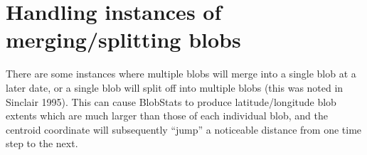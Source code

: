\documentclass{article}
\begin{document}
%
%
%
%

\section{Handling instances of merging/splitting blobs}\label{mergesection}
There are some instances where multiple blobs will merge into a single blob at a later date, or a single blob will split off into multiple blobs (this was noted in Sinclair 1995). This can cause BlobStats to produce latitude/longitude blob extents which are much larger than those of each individual blob, and the centroid coordinate will subsequently ``jump'' a noticeable distance from one time step to the next. 
\end{document}
